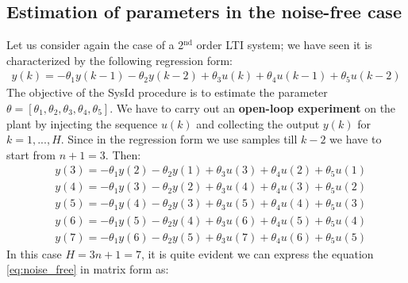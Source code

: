 \subsection{Estimation of parameters in the noise-free case}
Let us consider again the case of a 2$^\text{nd}$ order LTI system; we have seen it is characterized by the following regression form: 
\begin{equation*}
    \begin{aligned}
        y(k)=-\theta_1{y(k-1)}-\theta_2{y(k-2)}+\theta_3{u(k)}+\theta_4{u(k-1)}+\theta_5{u(k-2)} 
    \end{aligned}
\end{equation*}
The objective of the SysId procedure is to estimate the parameter $\theta=[\theta_1, \theta_2, \theta_3,\theta_4, \theta_5]$. We have to carry out an \textbf{open-loop experiment} on the plant by injecting the sequence $u(k)$ and collecting the output $y(k)$ for $k=1,...,H$. Since in the regression form we use samples till $k-2$ we have to start from $n+1=3$. Then: 
\begin{equation}
    \begin{aligned} \label{eq:noise_free}
        &y(3)=-\theta_1{y(2)}    -\theta_2{y(1)} +\theta_3{u(3)} +\theta_4{u(2)}  +\theta_5{u(1)}\\
        &y(4)=-\theta_1{y(3)}    -\theta_2{y(2)} +\theta_3{u(4)} +\theta_4{u(3)}  +\theta_5{u(2)}\\
        &y(5)=-\theta_1{y(4)}    -\theta_2{y(3)} +\theta_3{u(5)} +\theta_4{u(4)}  +\theta_5{u(3)}\\
        &y(6)=-\theta_1{y(5)}    -\theta_2{y(4)} +\theta_3{u(6)} +\theta_4{u(5)}  +\theta_5{u(4)}\\
        &y(7)=-\theta_1{y(6)}    -\theta_2{y(5)} +\theta_3{u(7)} +\theta_4{u(6)}  +\theta_5{u(5)}
    \end{aligned}
\end{equation} 
In this case $H=3n+1=7$, it is quite evident we can express the equation \ref{eq:noise_free} in matrix form as:
